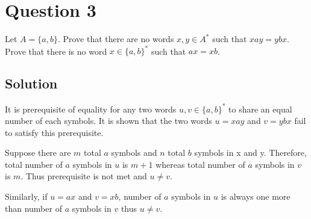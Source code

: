 
\section*{Question 3}

Let $A = \{a,b\}$.
Prove that there are no words $x, y \in A^*$ such that $xay = ybx$.
Prove that there is no word $x \in \{a,b\}^*$ such that $ax = xb$.

\subsection*{Solution}

It is prerequisite of equality for any two words $u, v \in \{a,b\}^*$ to share an equal number of each symbols.
It is shown that the two words $u=xay$ and $v=ybx$ fail to satisfy this prerequisite.

Suppose there are $m$ total $a$ symbols and $n$ total $b$ symbols in x and y.
Therefore, total number of $a$ symbols in $u$ is $m+1$ whereas total number of $a$ symbols in $v$ is $m$.
Thus prerequisite is not met and $u \neq v$.

Similarly, if $u = ax$ and $v = xb$, number of $a$ symbols in $u$ is always one more than number of $a$ symbols in $v$ thus $u \neq v$.
